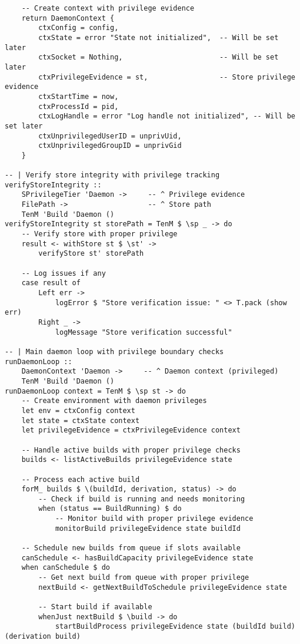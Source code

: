 \documentclass{article}
\begin{document}
\begin{tcolorbox}[title=Ten/Daemon/Core.hs Changes]
\begin{verbatim}
    -- Create context with privilege evidence
    return DaemonContext {
        ctxConfig = config,
        ctxState = error "State not initialized",  -- Will be set later
        ctxSocket = Nothing,                       -- Will be set later
        ctxPrivilegeEvidence = st,                 -- Store privilege evidence
        ctxStartTime = now,
        ctxProcessId = pid,
        ctxLogHandle = error "Log handle not initialized", -- Will be set later
        ctxUnprivilegedUserID = unprivUid,
        ctxUnprivilegedGroupID = unprivGid
    }

-- | Verify store integrity with privilege tracking
verifyStoreIntegrity ::
    SPrivilegeTier 'Daemon ->     -- ^ Privilege evidence
    FilePath ->                   -- ^ Store path
    TenM 'Build 'Daemon ()
verifyStoreIntegrity st storePath = TenM $ \sp _ -> do
    -- Verify store with proper privilege
    result <- withStore st $ \st' ->
        verifyStore st' storePath

    -- Log issues if any
    case result of
        Left err ->
            logError $ "Store verification issue: " <> T.pack (show err)
        Right _ ->
            logMessage "Store verification successful"

-- | Main daemon loop with privilege boundary checks
runDaemonLoop ::
    DaemonContext 'Daemon ->     -- ^ Daemon context (privileged)
    TenM 'Build 'Daemon ()
runDaemonLoop context = TenM $ \sp st -> do
    -- Create environment with daemon privileges
    let env = ctxConfig context
    let state = ctxState context
    let privilegeEvidence = ctxPrivilegeEvidence context

    -- Handle active builds with proper privilege checks
    builds <- listActiveBuilds privilegeEvidence state

    -- Process each active build
    forM_ builds $ \(buildId, derivation, status) -> do
        -- Check if build is running and needs monitoring
        when (status == BuildRunning) $ do
            -- Monitor build with proper privilege evidence
            monitorBuild privilegeEvidence state buildId

    -- Schedule new builds from queue if slots available
    canSchedule <- hasBuildCapacity privilegeEvidence state
    when canSchedule $ do
        -- Get next build from queue with proper privilege
        nextBuild <- getNextBuildToSchedule privilegeEvidence state

        -- Start build if available
        whenJust nextBuild $ \build -> do
            startBuildProcess privilegeEvidence state (buildId build) (derivation build)


\end{verbatim}
\end{tcolorbox}
\end{document}
